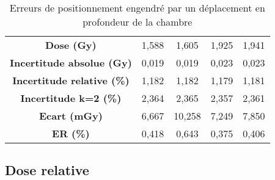 \documentclass{article}
\begin{document}
\begin{table}[h]
\begin{tabular}{c|cc|cc|}
  \multicolumn{1}{|c|}{\textbf{Dose (Gy)}}                 & 1,588           & 1,605          & 1,925           & 1,941           \\
  \multicolumn{1}{|c|}{\textbf{Incertitude absolue (Gy)}}  & 0,019           & 0,019          & 0,023           & 0,023           \\
  \multicolumn{1}{|c|}{\textbf{Incertitude relative (\%)}} & 1,182           & 1,182          & 1,179           & 1,181           \\
  \multicolumn{1}{|c|}{\textbf{Incertitude k=2 (\%)}}      & 2,364           & 2,365          & 2,357           & 2,361           \\
  \multicolumn{1}{|c|}{\textbf{Ecart (mGy)}}               & 6,667           & 10,258         & 7,249           & 7,850           \\
  \multicolumn{1}{|c|}{\textbf{ER (\%)}}                   & 0,418           & 0,643          & 0,375           & 0,406           \\ \hline
  \end{tabular}
  \caption{Erreurs de positionnement engendré par un déplacement en profondeur de la chambre}
  \label{table_erreur_profondeur}
  \end{table}

\subsection{Dose relative}

\clearpage


\nocite{*}
\end{document}
